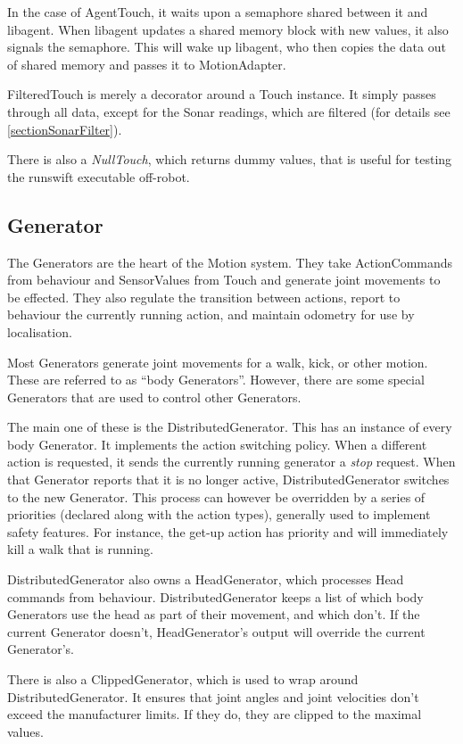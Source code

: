 \documentclass[pdftex,11pt,a4paper]{report}
\begin{document}
In the case of AgentTouch, it waits upon a semaphore shared between it and
libagent. When libagent updates a shared memory block with new values, it
also signals the semaphore. This will wake up libagent, who then copies the
data out of shared memory and passes it to MotionAdapter. 

FilteredTouch is merely a decorator around a Touch instance. It simply
passes through all data, except for the Sonar readings, which are filtered
(for details see \autoref{sectionSonarFilter}).

There is also a \emph{NullTouch}, which returns dummy values, that is
useful for testing the runswift executable off-robot.

\subsection{Generator}
The Generators are the heart of the Motion system. They take ActionCommands
from behaviour and SensorValues from Touch and generate joint movements to
be effected. They also regulate the transition between actions, report to
behaviour the currently running action, and maintain odometry for use by
localisation.

Most Generators generate joint movements for a walk, kick, or other motion.
These are referred to as ``body Generators''.  However, there are some
special Generators that are used to control other Generators. 

The main one of these is the DistributedGenerator. This has an instance of
every body Generator. It implements the action switching policy. When a
different action is requested, it sends the currently running generator a
\emph{stop} request. When that Generator reports that it is no longer
active, DistributedGenerator switches to the new Generator.  This process
can however be overridden by a series of priorities (declared along with the
action types), generally used to implement safety features. For instance,
the get-up action has priority and will immediately kill a walk that is
running.

DistributedGenerator also owns a HeadGenerator, which processes Head
commands from behaviour.  DistributedGenerator keeps a list of which body
Generators use the head as part of their movement, and which don't. If the
current Generator doesn't, HeadGenerator's output will override the current
Generator's.

There is also a ClippedGenerator, which is used to wrap around
DistributedGenerator. It ensures that joint angles and joint velocities
don't exceed the manufacturer limits. If they do, they are clipped to the
maximal values.
\end{document}
